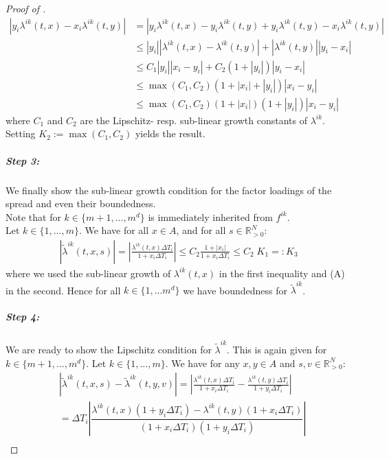 \documentclass[12pt]{article}
\begin{document}
\begin{proof}[Proof of ]
\begin{align*}
			\left| y_i \lambda^{ik}(t, x) - x_i \lambda^{ik}(t,y) \right| &= \left| y_i \lambda^{ik}(t, x) - y_i \lambda^{ik}(t,y) + y_i \lambda^{ik}(t,y) - x_i \lambda^{ik}(t,y) \right|\\
			&\le \left| y_i \right| \left|\lambda^{ik}(t, x) - \lambda^{ik}(t,y) \right|+ \left|\lambda^{ik}(t,y)\right| \left|y_i - x_i\right|\\
			& \le C_1 \left| y_i \right| \left|x_i - y_i\right|+ C_2\left(1 + \left|y_i\right|\right) \left|y_i - x_i\right|\\
			&\le \max\left(C_1, C_2\right) \left(1 + \left|x_i\right| + \left| y_i \right| \right) \left|x_i - y_i\right|\\
			&\le \max\left(C_1, C_2\right) \left(1 + \left|x_i\right|\right) \left( 1 +\left| y_i \right| \right) \left|x_i - y_i\right|
		\end{align*}
		where $C_1$ and $C_2$ are the Lipschitz- resp. sub-linear growth constants of $\lambda^{i k}$. Setting $K_2:=\max\left(C_1, C_2\right)$ yields  the result.
		\subparagraph{Step 3:}
		We finally show the sub-linear growth condition for the factor loadings of the spread and even their boundedness.\\
		Note that for $k\in\{m+1, ..., m^d\}$ is immediately inherited from $f^{i k}$.\\
		Let $k\in\{1,...,m\}$. We have for all $x \in A$, and for all $s\in \mathbb{R}_{>0}^N$:
		\begin{align*}
			\left|\tilde{\lambda}^{i k}\left(t,x, s\right)\right| = \left|\frac{\lambda^{i k}(t,x) \Delta T_i}{1 + x_i\Delta T_i}\right|\le C_2 \frac{1+|x_i|}{1+x_i\Delta T_i}\le C_2\;K_1=:K_3\tag{C}
		\end{align*}
		where we used the sub-linear growth of $\lambda^{ik}(t,x)$ in the first inequality and (A) in the second. Hence for all $k\in\{1,...m^d\}$ we have boundedness for $\tilde{\lambda}^{ik}$.
		\subparagraph{Step 4:}
		We are ready to show the Lipschitz condition for $\tilde{\lambda}^{ik}$. This is again given for $k\in\{m+1, ..., m^d\}$. Let $k\in\{1, ..., m\}$. We have for any $x,y \in A$ and $s,v \in \mathbb{R}_{>0}^N$:
		\begin{align*}
			&\left|\tilde{\lambda}^{ik}(t,x,s) - \tilde{\lambda}^{ik}(t,y,v)\right| = \left|\frac{\lambda^{i k}(t,x) \Delta T_i}{1 + x_i\Delta T_i} - \frac{\lambda^{i k}(t,y) \Delta T_i}{1 + y_i\Delta T_i}\right| \\
			&= \Delta T_i \left|\dfrac{\lambda^{i k}(t,x)\left(1 + y_i\Delta T_i\right) - \lambda^{i k}(t,y)\left(1 + x_i\Delta T_i\right)}{\left(1 + x_i\Delta T_i\right)\left(1 + y_i\Delta T_i\right)}\right|\\

\end{align*}
\end{proof}
\end{document}
